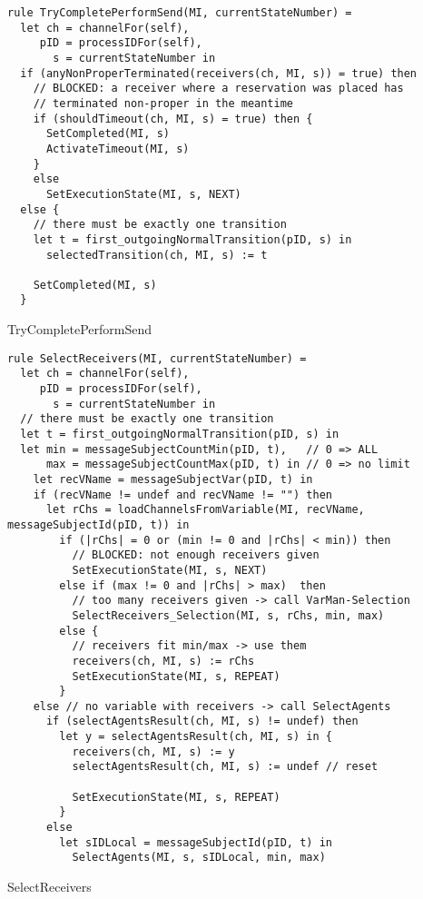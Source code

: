 \begin{listing}[H]
\begin{verbatim}
rule TryCompletePerformSend(MI, currentStateNumber) =
  let ch = channelFor(self),
     pID = processIDFor(self),
       s = currentStateNumber in
  if (anyNonProperTerminated(receivers(ch, MI, s)) = true) then
    // BLOCKED: a receiver where a reservation was placed has
    // terminated non-proper in the meantime
    if (shouldTimeout(ch, MI, s) = true) then {
      SetCompleted(MI, s)
      ActivateTimeout(MI, s)
    }
    else
      SetExecutionState(MI, s, NEXT)
  else {
    // there must be exactly one transition
    let t = first_outgoingNormalTransition(pID, s) in
      selectedTransition(ch, MI, s) := t

    SetCompleted(MI, s)
  }
\end{verbatim}
\caption{TryCompletePerformSend}
\label{lst:asm:TryCompletePerformSend}
\end{listing}




\begin{listing}[H]
\begin{verbatim}
rule SelectReceivers(MI, currentStateNumber) =
  let ch = channelFor(self),
     pID = processIDFor(self),
       s = currentStateNumber in
  // there must be exactly one transition
  let t = first_outgoingNormalTransition(pID, s) in
  let min = messageSubjectCountMin(pID, t),   // 0 => ALL
      max = messageSubjectCountMax(pID, t) in // 0 => no limit
    let recVName = messageSubjectVar(pID, t) in
    if (recVName != undef and recVName != "") then
      let rChs = loadChannelsFromVariable(MI, recVName, messageSubjectId(pID, t)) in
        if (|rChs| = 0 or (min != 0 and |rChs| < min)) then
          // BLOCKED: not enough receivers given
          SetExecutionState(MI, s, NEXT)
        else if (max != 0 and |rChs| > max)  then
          // too many receivers given -> call VarMan-Selection
          SelectReceivers_Selection(MI, s, rChs, min, max)
        else {
          // receivers fit min/max -> use them
          receivers(ch, MI, s) := rChs
          SetExecutionState(MI, s, REPEAT)
        }
    else // no variable with receivers -> call SelectAgents
      if (selectAgentsResult(ch, MI, s) != undef) then
        let y = selectAgentsResult(ch, MI, s) in {
          receivers(ch, MI, s) := y
          selectAgentsResult(ch, MI, s) := undef // reset

          SetExecutionState(MI, s, REPEAT)
        }
      else
        let sIDLocal = messageSubjectId(pID, t) in
          SelectAgents(MI, s, sIDLocal, min, max)
\end{verbatim}
\caption{SelectReceivers}
\label{lst:asm:SelectReceivers}
\end{listing}




